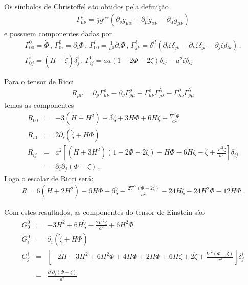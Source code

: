 \documentclass[
	12pt,				%
	openright,			%
	oneside,			%
	a4paper,			%
	english,			%
	french,				%
	spanish,			%
	brazil				%
	]{abntex2}
\begin{document}
\begin{apendicesenv}
Os símbolos de Christoffel são obtidos pela definição
\begin{eqnarray}\label{A5}
\Gamma_{\mu\nu}^{\rho}=\frac{1}{2}g^{\rho\alpha}\left(\partial_{\nu}g_{\mu\alpha}+\partial_{\mu}g_{\alpha\nu}-\partial_{\alpha}g_{\mu\nu}\right)
\end{eqnarray}
e possuem componentes dadas por
\begin{eqnarray}\label{A6}
\Gamma_{00}^{0}=\dot{\Phi}\,\mbox{,}\,\,\Gamma_{0i}^{0}=\partial_{i}\Phi\,\mbox{,}\,\,\Gamma_{00}^{i}=\frac{1}{a^{2}}\partial_{i}\Phi\,\mbox{,}\,\,\Gamma_{jk}^{i}=\delta^{il}\left(\partial_{l}\zeta\delta_{jk}-\partial_{k}\zeta\delta_{jl}-\partial_{j}\zeta\delta_{lk}\right)\,\mbox{,}\nonumber\\
\Gamma_{0j}^{i}=(H-\dot{\zeta})\delta_{j}^{i}\,\mbox{,}\,\,\Gamma_{ij}^{0}=a\dot{a}\left(1-2\Phi -2\zeta\right)\delta_{ij}-a^{2}\dot{\zeta}\delta_{ij}
\end{eqnarray}

Para o tensor de Ricci
\begin{eqnarray}\label{A7}
R_{\mu\nu}=\partial_{\rho}\Gamma_{\mu\nu}^{\rho}-\partial_{\nu}\Gamma_{\rho\mu}^{\rho}+\Gamma_{\mu\nu}^{\rho}\Gamma_{\rho\lambda}^{\lambda}-\Gamma_{\lambda\nu}^{\rho}\Gamma_{\rho\mu}^{\lambda}
\end{eqnarray}
temos as componentes
\begin{eqnarray}\label{A8}
R_{00} &=& -3(\dot{H}+H^{2})+3\ddot{\zeta}+3H\dot{\Phi}+6H\dot{\zeta}+\frac{\nabla^{2}\Phi}{a^{2}}\nonumber\\
R_{i0} &=& 2\partial_{i}(\dot{\zeta}+H\Phi)\nonumber\\
R_{ij} &=& a^{2}\left[(\dot{H}+3H^{2})(1-2\Phi -2\zeta)-H\dot{\Phi}-6H\dot{\zeta}-\ddot{\zeta} +\frac{\nabla^{2}\zeta}{a^{2}}\right]\delta_{ij}\nonumber\\
&-& \partial_{i}\partial_{j}(\Phi - \zeta)\,\mbox{.}
\end{eqnarray}
Logo o escalar de Ricci será:
\begin{eqnarray}\label{A9}
R = 6(\dot{H}+2H^{2})-6H\dot{\Phi}-6\ddot{\zeta}-\frac{2\nabla^{2}(\Phi -2\zeta)}{a^{2}}-24H\dot{\zeta}-24H^{2}\Phi -12\dot{H}\Phi\,\mbox{.}
\end{eqnarray}

Com estes resultados, as componentes do tensor de Einstein são
\begin{eqnarray}\label{A10}
G_{0}^{0} &=& -3H^{2}+6H\dot{\zeta}-\frac{2\nabla^{2}\zeta}{a^{2}}+6H^{2}\Phi\nonumber\\
G_{i}^{0} &=& \partial_{i}(\dot{\zeta}+H\Phi)\nonumber\\
G_{j}^{i} &=& \left[-2\dot{H}-3H^{2}+6H^{2}\Phi +4\dot{H}\Phi +2H\dot{\Phi} +6H\dot{\zeta}+2\ddot{\zeta}+\frac{\nabla^{2}(\Phi -\zeta)}{a^{2}}\right]\delta_{j}^{i}\nonumber\\
&-& \frac{\partial^{i}\partial_{j}(\Phi -\zeta)}{a^{2}}
\end{eqnarray}


\end{apendicesenv}
\end{document}
